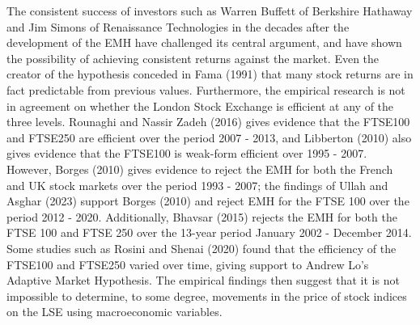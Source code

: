 \documentclass[12pt,a4paper]{article}
\begin{document}
The consistent success of investors such as Warren Buffett of Berkshire Hathaway and Jim Simons of Renaissance Technologies in the decades after the development of the EMH have challenged its central argument, and have shown the possibility of achieving consistent returns against the market. Even the creator of the hypothesis conceded in Fama (1991) that many stock returns are in fact predictable from previous values. Furthermore, the empirical research is not in agreement on whether the London Stock Exchange is efficient at any of the three levels. Rounaghi and Nassir Zadeh (2016) gives evidence that the FTSE100 and FTSE250 are efficient over the period 2007 - 2013, and Libberton (2010) also gives evidence that the FTSE100 is weak-form efficient over 1995 - 2007. However, Borges (2010) gives evidence to reject the EMH for both the French and UK stock markets over the period 1993 - 2007; the findings of Ullah and Asghar (2023) support Borges (2010) and reject EMH for the FTSE 100 over the period 2012 - 2020. Additionally, Bhavsar (2015) rejects the EMH for both the FTSE 100 and FTSE 250 over the 13-year period January 2002 - December 2014. Some studies such as Rosini and Shenai (2020) found that the efficiency of the FTSE100 and FTSE250 varied over time, giving support to Andrew Lo’s Adaptive Market Hypothesis. The empirical findings then suggest that it is not impossible to determine, to some degree, movements in the price of stock indices on the LSE using macroeconomic variables.
\end{document}

